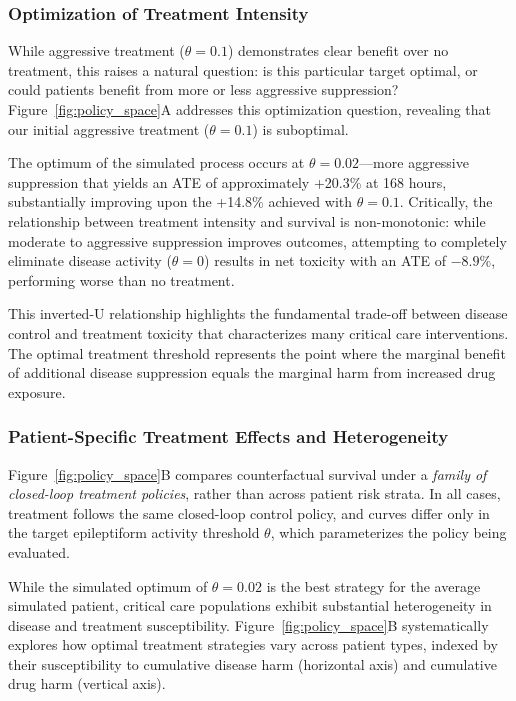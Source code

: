 \subsubsection{Optimization of Treatment Intensity}

While aggressive treatment ($\theta = 0.1$) demonstrates clear benefit over no treatment, this raises a natural question: is this particular target optimal, or could patients benefit from more or less aggressive suppression? Figure~\ref{fig:policy_space}A addresses this optimization question, revealing that our initial aggressive treatment ($\theta = 0.1$) is suboptimal.

The optimum of the simulated process occurs at $\theta = 0.02$---more aggressive suppression that yields an ATE of approximately +20.3\% at 168 hours, substantially improving upon the +14.8\% achieved with $\theta = 0.1$. Critically, the relationship between treatment intensity and survival is non-monotonic: while moderate to aggressive suppression improves outcomes, attempting to completely eliminate disease activity ($\theta = 0$) results in net toxicity with an ATE of $-8.9\%$, performing worse than no treatment.

This inverted-U relationship highlights the fundamental trade-off between disease control and treatment toxicity that characterizes many critical care interventions. The optimal treatment threshold represents the point where the marginal benefit of additional disease suppression equals the marginal harm from increased drug exposure.


\subsubsection{Patient-Specific Treatment Effects and Heterogeneity}
Figure~\ref{fig:policy_space}B compares counterfactual survival under a \emph{family of closed-loop treatment policies}, rather than across patient risk strata. In all cases, treatment follows the same closed-loop control policy, and curves differ only in the target epileptiform activity threshold $\theta$, which parameterizes the policy being evaluated.

While the simulated optimum of $\theta = 0.02$ is the best strategy for the average simulated patient, critical care populations exhibit substantial heterogeneity in disease and treatment susceptibility. Figure~\ref{fig:policy_space}B systematically explores how optimal treatment strategies vary across patient types, indexed by their susceptibility to cumulative disease harm (horizontal axis) and cumulative drug harm (vertical axis).

